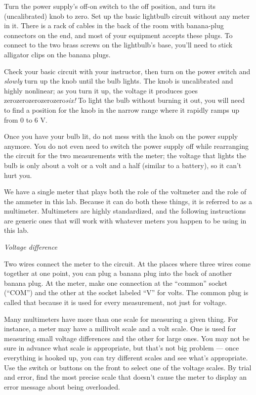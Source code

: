 Turn the power supply's off-on switch to the off position, and
turn its (uncalibrated) knob to zero.
Set up the basic lightbulb circuit without any meter in it.
There is a rack of cables in the back of the room with banana-plug
connectors on the end, and
most of your equipment accepts these plugs.
To connect to the two brass screws on the lightbulb's base, you'll
need to stick alligator clips on the banana plugs. 

Check your basic circuit with your instructor, then turn on the power
switch and \emph{slowly} turn up the knob until the bulb lights.
The knob is uncalibrated and highly nonlinear; as you turn it up,
the voltage it produces goes zerozerozerozerozero\emph{six!}
To light the bulb without burning it out, you will need to
find a position for the knob in the narrow range where it
rapidly ramps up from 0 to 6 V.

Once you have your bulb lit, do not mess with the knob on the
power supply anymore. You do not even need to switch the power
supply off while rearranging the circuit for the two measurements
with the meter; the voltage that lights the bulb is only about
a volt or a volt and a half (similar to a battery), so it can't
hurt you.

We have a single meter that plays both the role of the voltmeter
and the role of the ammeter in this lab. Because it can do both
these things, it is referred to as a multimeter. Multimeters are
highly standardized, and the following instructions are generic
ones that will work with whatever meters you happen to be using
in this lab.

\emph{Voltage difference}

Two wires connect the meter to the circuit. 
At the places where three wires come together at
one point, you can plug a banana plug into the back of
another banana plug. At the meter, make one connection
at the ``common'' socket (``COM'') and the other at the
socket labeled ``V'' for volts. The common plug is called
that because it is used for every measurement, not just for
voltage.

Many multimeters have more than one scale for
measuring a given thing. For instance, a meter may have a
millivolt scale and a volt scale. One is used for measuring
small voltage differences and the other for large ones. You may not
be sure in advance what scale is appropriate, but that's not
big problem --- once everything is hooked up, you can try
different scales and see what's appropriate. Use the switch
or buttons on the front to select one of the voltage scales.
By trial and error, find the most precise scale that doesn't
cause the meter to display an error message about being overloaded.

